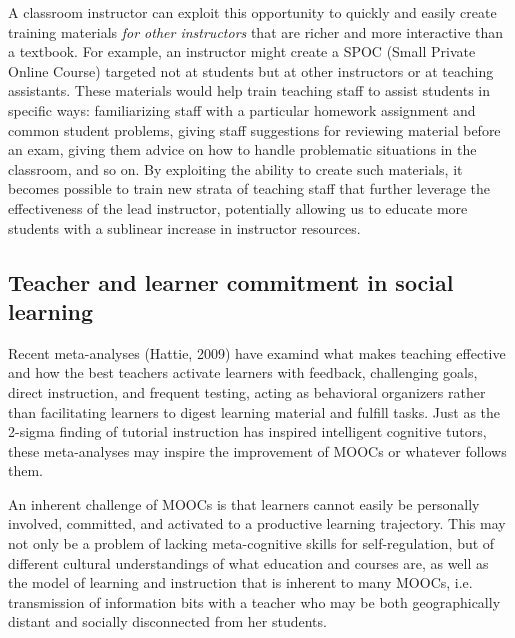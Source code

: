 A classroom instructor can exploit this opportunity to quickly and
easily create training materials \emph{for other instructors} that are
richer and more interactive than a textbook. For example, an instructor
might create a SPOC (Small Private Online Course) targeted not at
students but at other instructors or at teaching assistants.  These
materials would help train teaching staff to assist students in specific
ways: familiarizing staff with a particular homework assignment and
common student problems, giving staff suggestions for reviewing material
before an exam, giving them advice on how to handle problematic
situations in the classroom, and so on.  By exploiting the ability to
create such materials, it becomes possible to train new strata of
teaching staff that further leverage the effectiveness of the lead
instructor, potentially allowing us to educate more students with a
sublinear increase in instructor resources.



\subsection{Teacher and learner commitment in social learning}



Recent meta-analyses (Hattie, 2009) have examind what makes teaching
effective and how the best teachers activate learners with feedback,
challenging goals, direct instruction, and frequent testing, acting as
behavioral organizers rather than facilitating learners to digest
learning material and fulfill tasks.
Just as the 2-sigma finding of tutorial instruction has inspired
intelligent cognitive tutors, these meta-analyses may inspire the
improvement of MOOCs or
whatever follows them.

An inherent challenge of MOOCs is
that learners cannot easily be personally involved, committed, and
activated to a productive learning trajectory. This may not only be a
problem of lacking meta-cognitive skills for self-regulation, but
of different cultural understandings of what education and  courses are, as
well as the model of learning and instruction that is inherent to many
MOOCs, i.e. transmission of information bits with a teacher who may be
both geographically distant and socially disconnected from her students.

